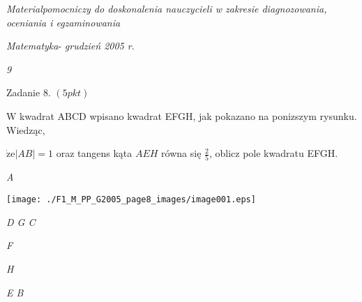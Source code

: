 \documentclass[a4paper,12pt]{article}
\begin{document}
{\it Materialpomocniczy do doskonalenia nauczycieli w zakresie diagnozowania, oceniania i egzaminowania}

{\it Matematyka}- {\it grudzień 2005 r}.

{\it 9}

Zadanie 8. $(5pkt)$

$\mathrm{W}$ kwadrat ABCD wpisano kwadrat EFGH, jak pokazano na ponizszym rysunku. Wiedząc,

$\dot{\mathrm{z}}\mathrm{e}|AB|=1$ oraz tangens kąta $AEH$ równa się $\displaystyle \frac{2}{5}$, oblicz pole kwadratu EFGH.

{\it A}
\begin{center}
\texttt{[image: ./F1\_M\_PP\_G2005\_page8\_images/image001.eps]}
\end{center}
{\it D  G  C}

{\it F}

{\it H}

{\it E B}
\end{document}

